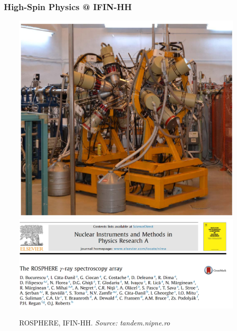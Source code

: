 \documentclass{beamer}
\begin{document}
\begin{frame}
	\frametitle{\faSearch\ High-Spin Physics @ IFIN-HH}
		\begin{figure}
		\centering
		\includegraphics[scale=0.31]{figures/ro-sphere.pdf}
		\includegraphics[scale=0.15]{figures/rosphere-paper.png}
		\caption{ROSPHERE, IFIN-HH. \textit{Source: tandem.nipne.ro}}
	\end{figure}
\end{frame}
\end{document}
